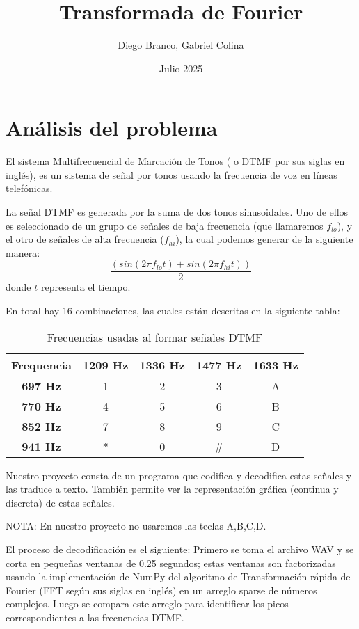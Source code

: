 \documentclass{article}
\title{Transformada de Fourier}
\author{Diego Branco, Gabriel Colina}
\date{Julio 2025}
\begin{document}
\maketitle

\section{Análisis del problema}


El sistema Multifrecuencial de Marcación de Tonos ( o DTMF por sus siglas en inglés), es un sistema de señal por tonos usando la frecuencia de voz en líneas telefónicas. 

La señal DTMF es generada por la suma de dos tonos sinusoidales. Uno de ellos es seleccionado de un grupo de señales de baja frecuencia (que llamaremos $f_{lo}$), y el otro de señales de alta frecuencia ($f_{hi}$), la cual podemos generar  de la siguiente manera:
\begin{equation}
    \frac{(sin(2\pi f_{lo} t)+sin(2\pi f_{hi} t))}{2}
\end{equation}
donde $t$ representa el tiempo.

En total hay 16 combinaciones, las cuales están descritas en la siguiente tabla:
\begin{table}[ht!]
\centering
\caption{Frecuencias usadas al formar señales DTMF}
\begin{tabular}{c|cccc}
\hline
\textbf{Frequencia}& \textbf{1209 Hz} & \textbf{1336 Hz} & \textbf{1477 Hz} & \textbf{1633 Hz} \\
\hline
\textbf{697 Hz} & 1 & 2 & 3 & A \\
\textbf{770 Hz} & 4 & 5 & 6 & B \\
\textbf{852 Hz} & 7 & 8 & 9 & C \\
\textbf{941 Hz} & * & 0 & \#& D \\
\hline
\end{tabular}
\end{table}
Nuestro proyecto consta de un programa que codifica y decodifica estas señales y las traduce a texto. También permite ver la representación gráfica (continua y discreta) de estas señales.

NOTA: En nuestro proyecto no usaremos las teclas A,B,C,D.

El proceso de decodificación es el siguiente:
Primero se toma el archivo WAV y se corta en pequeñas ventanas de 0.25 segundos; estas ventanas son factorizadas usando la implementación de NumPy del algoritmo de Transformación rápida de Fourier (FFT según sus siglas en inglés) en un arreglo sparse de números complejos.  Luego se compara este arreglo para identificar los picos correspondientes a las frecuencias DTMF.
\end{document}

